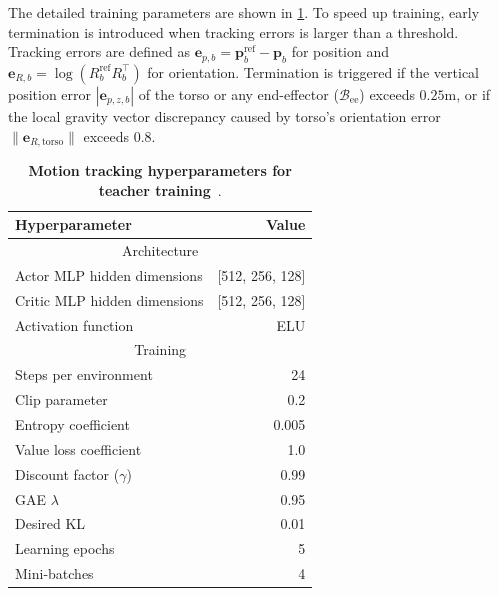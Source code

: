 The detailed training parameters are shown in \cref{tab:ppo_hyperparameters}. To speed up training, early termination is introduced when tracking errors is larger than a threshold. Tracking errors are defined as $\mathbf{e}_{p,b} = \mathbf{p}_{b}^\mathrm{ref} - \mathbf{p}_b$ for position and $\mathbf{e}_{R,b} = \log(R_{b}^\mathrm{ref} R_b^\top)$ for orientation. Termination is triggered if the vertical position error $|\mathbf{e}_{p,z,b}|$ of the torso or any end-effector ($\mathcal{B}_\text{ee}$) exceeds $0.25\text{m}$, or if the local gravity vector discrepancy caused by torso's orientation error $\|\mathbf{e}_{R,\text{torso}}\|$ exceeds $0.8$.
\begin{table}[ht]
  \centering
  \caption{\textbf{Motion tracking hyperparameters for teacher training}~\cite{liao2025beyondmimic}.}
  \label{tab:ppo_hyperparameters}
  \begin{tabular}{lr}
    \\
    \hline
    Hyperparameter & Value \\
    \hline
    \multicolumn{2}{c}{Architecture} \\
    \hline
    Actor MLP hidden dimensions & [512, 256, 128] \\
    Critic MLP hidden dimensions & [512, 256, 128] \\
    Activation function & ELU \\
    \hline
    \multicolumn{2}{c}{Training} \\
    \hline
    Steps per environment & 24 \\
    Clip parameter & 0.2 \\
    Entropy coefficient & 0.005 \\
    Value loss coefficient & 1.0 \\
    Discount factor ($\gamma$) & 0.99 \\
    GAE $\lambda$ & 0.95 \\
    Desired KL & 0.01 \\
    Learning epochs & 5 \\
    Mini-batches & 4 \\
    \hline
  \end{tabular}
\end{table}

% 



